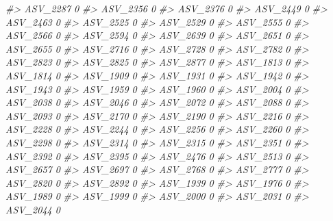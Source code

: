 \documentclass[
]{article}
\newenvironment{Shaded}{\begin{snugshade}}{\end{snugshade}}
\newcommand{\CommentTok}[1]{\textcolor[rgb]{0.56,0.35,0.01}{\textit{#1}}}
\begin{document}
\begin{Shaded}
\begin{Highlighting}[]
\CommentTok{\#\textgreater{} ASV\_2287  0}
\CommentTok{\#\textgreater{} ASV\_2356  0}
\CommentTok{\#\textgreater{} ASV\_2376  0}
\CommentTok{\#\textgreater{} ASV\_2449  0}
\CommentTok{\#\textgreater{} ASV\_2463  0}
\CommentTok{\#\textgreater{} ASV\_2525  0}
\CommentTok{\#\textgreater{} ASV\_2529  0}
\CommentTok{\#\textgreater{} ASV\_2555  0}
\CommentTok{\#\textgreater{} ASV\_2566  0}
\CommentTok{\#\textgreater{} ASV\_2594  0}
\CommentTok{\#\textgreater{} ASV\_2639  0}
\CommentTok{\#\textgreater{} ASV\_2651  0}
\CommentTok{\#\textgreater{} ASV\_2655  0}
\CommentTok{\#\textgreater{} ASV\_2716  0}
\CommentTok{\#\textgreater{} ASV\_2728  0}
\CommentTok{\#\textgreater{} ASV\_2782  0}
\CommentTok{\#\textgreater{} ASV\_2823  0}
\CommentTok{\#\textgreater{} ASV\_2825  0}
\CommentTok{\#\textgreater{} ASV\_2877  0}
\CommentTok{\#\textgreater{} ASV\_1813  0}
\CommentTok{\#\textgreater{} ASV\_1814  0}
\CommentTok{\#\textgreater{} ASV\_1909  0}
\CommentTok{\#\textgreater{} ASV\_1931  0}
\CommentTok{\#\textgreater{} ASV\_1942  0}
\CommentTok{\#\textgreater{} ASV\_1943  0}
\CommentTok{\#\textgreater{} ASV\_1959  0}
\CommentTok{\#\textgreater{} ASV\_1960  0}
\CommentTok{\#\textgreater{} ASV\_2004  0}
\CommentTok{\#\textgreater{} ASV\_2038  0}
\CommentTok{\#\textgreater{} ASV\_2046  0}
\CommentTok{\#\textgreater{} ASV\_2072  0}
\CommentTok{\#\textgreater{} ASV\_2088  0}
\CommentTok{\#\textgreater{} ASV\_2093  0}
\CommentTok{\#\textgreater{} ASV\_2170  0}
\CommentTok{\#\textgreater{} ASV\_2190  0}
\CommentTok{\#\textgreater{} ASV\_2216  0}
\CommentTok{\#\textgreater{} ASV\_2228  0}
\CommentTok{\#\textgreater{} ASV\_2244  0}
\CommentTok{\#\textgreater{} ASV\_2256  0}
\CommentTok{\#\textgreater{} ASV\_2260  0}
\CommentTok{\#\textgreater{} ASV\_2298  0}
\CommentTok{\#\textgreater{} ASV\_2314  0}
\CommentTok{\#\textgreater{} ASV\_2315  0}
\CommentTok{\#\textgreater{} ASV\_2351  0}
\CommentTok{\#\textgreater{} ASV\_2392  0}
\CommentTok{\#\textgreater{} ASV\_2395  0}
\CommentTok{\#\textgreater{} ASV\_2476  0}
\CommentTok{\#\textgreater{} ASV\_2513  0}
\CommentTok{\#\textgreater{} ASV\_2657  0}
\CommentTok{\#\textgreater{} ASV\_2697  0}
\CommentTok{\#\textgreater{} ASV\_2768  0}
\CommentTok{\#\textgreater{} ASV\_2777  0}
\CommentTok{\#\textgreater{} ASV\_2820  0}
\CommentTok{\#\textgreater{} ASV\_2892  0}
\CommentTok{\#\textgreater{} ASV\_1939  0}
\CommentTok{\#\textgreater{} ASV\_1976  0}
\CommentTok{\#\textgreater{} ASV\_1989  0}
\CommentTok{\#\textgreater{} ASV\_1999  0}
\CommentTok{\#\textgreater{} ASV\_2000  0}
\CommentTok{\#\textgreater{} ASV\_2031  0}
\CommentTok{\#\textgreater{} ASV\_2044  0}

\end{Highlighting}
\end{Shaded}
\end{document}
